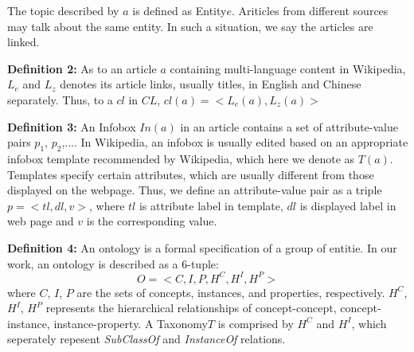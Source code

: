 \documentclass[runningheads,a4paper]{llncs}
\begin{document}
The topic described by $a$ is defined as Entity$e$. Ariticles from different sources may talk about the same entity. In such a situation, we say the articles are linked. 

\textbf{Definition 2:} As to an article $a$ containing multi-language content in Wikipedia, $L_{e}$ and $L_{z}$ denotes its article links, usually titles, in English and Chinese separately. Thus, to a $cl$ in $CL$, $cl(a) = <L_{e}(a), L_{z}(a)>$

\textbf{Definition 3:} An Infobox $In(a)$ in an article contains a set of attribute-value pairs {$p_{1}$, $p_{2}$,...}. In Wikipedia, an infobox is usually edited based on an appropriate infobox template recommended by Wikipedia, which here we denote as $T(a)$. Templates specify certain attributes, which are usually different from those displayed on the webpage. Thus, we define an attribute-value pair as a triple $p=<tl,dl,v>$, where $tl$ is attribute label in template, $dl$ is displayed label in web page and $v$ is the corresponding value.

\textbf{Definition 4:} An ontology is a formal specification of a group of entitie. In our work, an ontology is described as a 6-tuple:
\begin{equation}
    O = <C,I,P,H^C,H^I,H^P>
\end{equation}
where $C$, $I$, $P$ are the sets of concepts, instances, and properties, respectively. $H^C$, $H^I$, $H^P$ represents the hierarchical relationships of concept-concept, concept-instance, instance-property. A Taxonomy$T$ is comprised by $H^C$ and $H^I$, which seperately repesent \emph{SubClassOf} and \emph{InstanceOf} relations.
\end{document}
